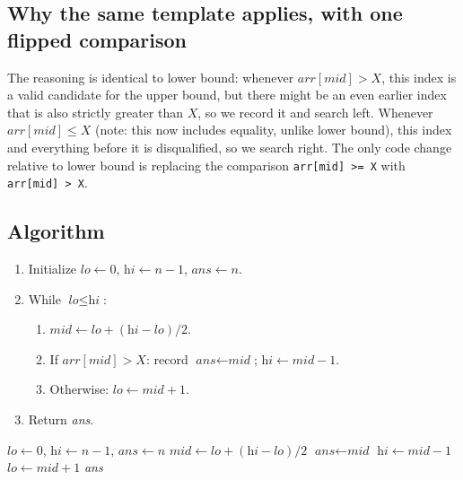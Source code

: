 \subsection*{Why the same template applies, with one flipped comparison}

The reasoning is identical to lower bound: whenever
$\textit{arr}[\textit{mid}] > X$, this index is a valid candidate for the
upper bound, but there might be an even earlier index that is also strictly
greater than $X$, so we record it and search left. Whenever
$\textit{arr}[\textit{mid}] \le X$ (note: this now includes equality, unlike
lower bound), this index and everything before it is disqualified, so we
search right. The only code change relative to lower bound is replacing the
comparison \texttt{arr[mid] >= X} with \texttt{arr[mid] > X}.

\subsection*{Algorithm}

\begin{enumerate}
  \item Initialize $\textit{lo} \gets 0$, $\textit{hi} \gets n-1$,
        $\textit{ans} \gets n$.
  \item While $\textit{lo} \le \textit{hi}$:
  \begin{enumerate}
    \item $\textit{mid} \gets \textit{lo} + (\textit{hi}-\textit{lo})/2$.
    \item If $\textit{arr}[\textit{mid}] > X$: record
          $\textit{ans} \gets \textit{mid}$; $\textit{hi} \gets
          \textit{mid}-1$.
    \item Otherwise: $\textit{lo} \gets \textit{mid}+1$.
  \end{enumerate}
  \item Return \textit{ans}.
\end{enumerate}

\begin{algorithm}[H]
\caption{Upper Bound}
\begin{algorithmic}[1]
  \State $\textit{lo} \gets 0$, $\textit{hi} \gets n-1$, $\textit{ans} \gets n$
    \State $\textit{mid} \gets \textit{lo} + (\textit{hi}-\textit{lo})/2$
      \State $\textit{ans} \gets \textit{mid}$
      \State $\textit{hi} \gets \textit{mid} - 1$
    \Else
      \State $\textit{lo} \gets \textit{mid} + 1$
    \EndIf
  \EndWhile
  \State \Return \textit{ans}
\EndProcedure
\end{algorithmic}
\end{algorithm}


